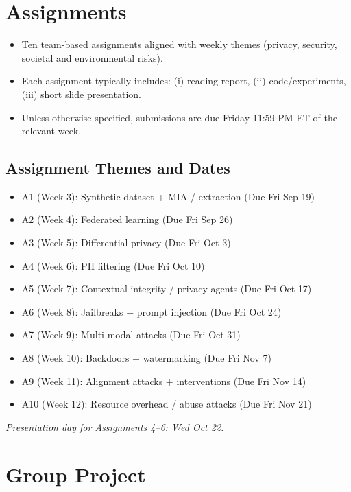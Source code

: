 \documentclass[11pt]{article}
\begin{document}
\section*{Assignments}
\begin{itemize}
  \item Ten team-based assignments aligned with weekly themes (privacy, security, societal and environmental risks).
  \item Each assignment typically includes: (i) reading report, (ii) code/experiments, (iii) short slide presentation.
  \item Unless otherwise specified, submissions are due Friday 11:59 PM ET of the relevant week.
\end{itemize}

\subsection*{Assignment Themes and Dates}
\begin{itemize}
  \item A1 (Week 3): Synthetic dataset + MIA / extraction (Due Fri Sep 19)
  \item A2 (Week 4): Federated learning (Due Fri Sep 26)
  \item A3 (Week 5): Differential privacy (Due Fri Oct 3)
  \item A4 (Week 6): PII filtering (Due Fri Oct 10)
  \item A5 (Week 7): Contextual integrity / privacy agents (Due Fri Oct 17)
  \item A6 (Week 8): Jailbreaks + prompt injection (Due Fri Oct 24)
  \item A7 (Week 9): Multi-modal attacks (Due Fri Oct 31)
  \item A8 (Week 10): Backdoors + watermarking (Due Fri Nov 7)
  \item A9 (Week 11): Alignment attacks + interventions (Due Fri Nov 14)
  \item A10 (Week 12): Resource overhead / abuse attacks (Due Fri Nov 21)
\end{itemize}
\textit{Presentation day for Assignments 4--6: Wed Oct 22.}

\section*{Group Project}
\end{document}
